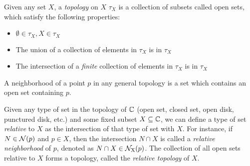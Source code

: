 \begin{definition}
Given any set $X$, a \emph{topology} on $X$ $\tau_X$ is a collection of subsets called open sets, which satisfy the following properties:
\begin{itemize}
\item $\emptyset \in \tau_X, X \in \tau_X$
\item The union of a collection of elements in $\tau_X$ is in $\tau_X$
\item The intersection of a \emph{finite} collection of elements in $\tau_X$ is in $\tau_X$
\end{itemize}
A neighborhood of a point $p$ in any general topology is a set which contains an open set containing $p$.
\end{definition}
\begin{definition}
Given any type of set in the topology of $\C$ (open set, closed set, open disk, punctured disk, etc.) and some fixed subset $X \subseteq \C$, we can define a type of set \emph{relative} to $X$ as the intersection of that type of set with $X$. For instance, if $N \in \nbhd{p}$ and $p \in X$, then the intersection $N \cap X$ is called a \emph{relative neighborhood} of $p$, denoted as $N \cap X \in \rnbhd{p}{X}$. The collection of all open sets relative to $X$ forms a topology, called the \emph{relative topology} of $X$.
\end{definition}
